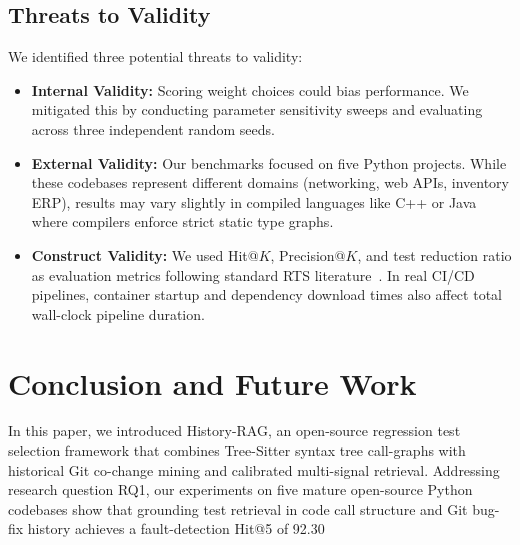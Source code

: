 \documentclass[12pt,onecolumn,draftclsnofoot]{IEEEtran}
\begin{document}
\subsection{Threats to Validity}
We identified three potential threats to validity:
\begin{itemize}
    \item \textbf{Internal Validity:} Scoring weight choices could bias performance. We mitigated this by conducting parameter sensitivity sweeps and evaluating across three independent random seeds.
    \item \textbf{External Validity:} Our benchmarks focused on five Python projects. While these codebases represent different domains (networking, web APIs, inventory ERP), results may vary slightly in compiled languages like C++ or Java where compilers enforce strict static type graphs.
    \item \textbf{Construct Validity:} We used Hit@$K$, Precision@$K$, and test reduction ratio as evaluation metrics following standard RTS literature~\cite{yoo2012regression}. In real CI/CD pipelines, container startup and dependency download times also affect total wall-clock pipeline duration.
\end{itemize}

\section{Conclusion and Future Work}
\label{sec:conclusion}
In this paper, we introduced History-RAG, an open-source regression test selection framework that combines Tree-Sitter syntax tree call-graphs with historical Git co-change mining and calibrated multi-signal retrieval. Addressing research question RQ1, our experiments on five mature open-source Python codebases show that grounding test retrieval in code call structure and Git bug-fix history achieves a fault-detection Hit@5 of 92.30%
\end{document}
